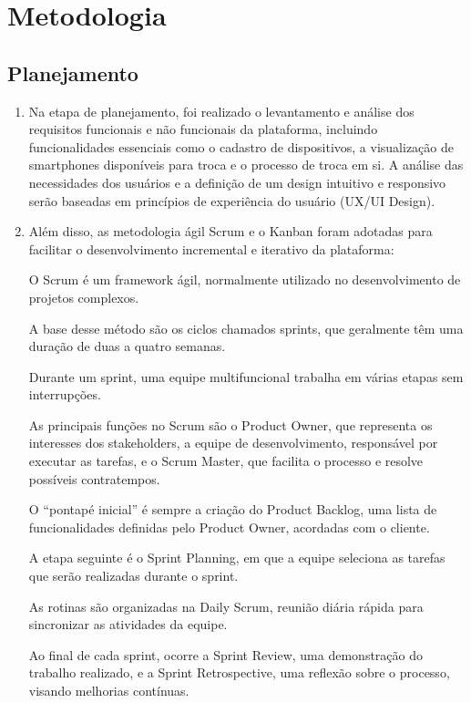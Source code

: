 \chapter{Metodologia}

\section{Planejamento}
\begin{enumerate}
    \item Na etapa de planejamento, foi realizado o levantamento e análise dos requisitos
    funcionais e não funcionais da plataforma, incluindo funcionalidades essenciais como
    o cadastro de dispositivos, a visualização de smartphones disponíveis para troca e o
    processo de troca em si. A análise das necessidades dos usuários e a definição de
    um design intuitivo e responsivo serão baseadas em princípios de experiência do
    usuário (UX/UI Design).

    \item Além disso, as metodologia ágil Scrum e o Kanban foram adotadas para facilitar o
    desenvolvimento incremental e iterativo da plataforma: 
        \begin{citacao}
            O Scrum é um framework ágil, normalmente utilizado no desenvolvimento de projetos complexos.

A base desse método são os ciclos chamados sprints, que geralmente têm uma duração de duas a quatro semanas.

Durante um sprint, uma equipe multifuncional trabalha em várias etapas sem interrupções.

As principais funções no Scrum são o Product Owner, que representa os interesses dos stakeholders, a equipe de desenvolvimento, responsável por executar as tarefas, e o Scrum Master, que facilita o processo e resolve possíveis contratempos.

O “pontapé inicial” é sempre a criação do Product Backlog, uma lista de funcionalidades definidas pelo Product Owner, acordadas com o cliente.

A etapa seguinte é o Sprint Planning, em que a equipe seleciona as tarefas que serão realizadas durante o sprint.

As rotinas são organizadas na Daily Scrum, reunião diária rápida para sincronizar as atividades da equipe.

Ao final de cada sprint, ocorre a Sprint Review, uma demonstração do trabalho realizado, e a Sprint Retrospective, uma reflexão sobre o processo, visando melhorias contínuas.


\end{citacao}
\end{enumerate}
